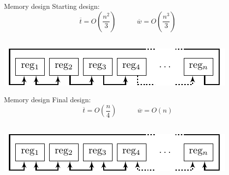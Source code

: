 \documentclass[svgnames, handout,t]{beamer}
\newenvironment{changemargin}[2]{%
\begin{list}{}{%
\setlength{\topsep}{0pt}%
\setlength{\leftmargin}{#1}%
\setlength{\rightmargin}{#2}%
\setlength{\listparindent}{\parindent}%
\setlength{\itemindent}{\parindent}%
\setlength{\parsep}{\parskip}%
}%
\item[]}{\end{list}}
\begin{document}
\begin{frame}{Memory design}
	Starting design:
	\[\overline{t} = O \left( \frac{n^2}{3} \right) \quad \qquad \overline{w} = O \left( \frac{n^3}{3} \right)\] \\[1.7em]
	
	\begin{changemargin}{-4cm}{-4cm}
		\begin{center}\includegraphics[width=0.8\paperwidth]{images/geheugen-circ}\end{center}
	\end{changemargin}
\end{frame}

\begin{frame}{Memory design}
	Final design:\\[0.3em]
	\[\overline{t} = O \left( \frac{n}{4} \right) \quad \qquad \overline{w} = O \left( n \right)\] \\[1.7em]
	
	\begin{changemargin}{-4cm}{-4cm}
		\begin{center}\includegraphics[width=0.8\paperwidth]{images/geheugen-circ-optimized}\end{center}
	\end{changemargin}
\end{frame}
\end{document}
